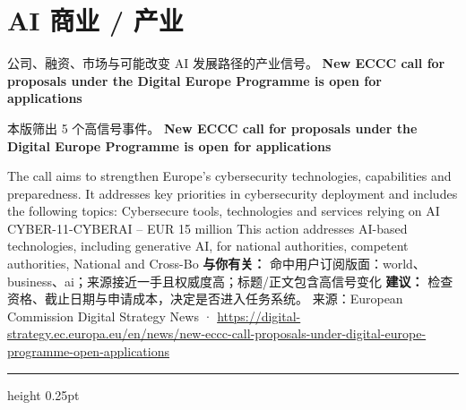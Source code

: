 \documentclass[10.5pt]{ctexart}
\begin{document}
\section*{AI 商业 / 产业}
{\color{ormuted} 公司、融资、市场与可能改变 AI 发展路径的产业信号。}
\vspace{2mm}
{\LARGE\bfseries New ECCC call for proposals under the Digital Europe Programme is open for applications}\par
\vspace{1mm}
{\color{ormuted} 本版筛出 5 个高信号事件。}
\vspace{3mm}
{\Large\bfseries New ECCC call for proposals under the Digital Europe Programme is open for applications}\par
The call aims to strengthen Europe’s cybersecurity technologies, capabilities and preparedness. It addresses key priorities in cybersecurity deployment and includes the following topics: Cybersecure tools, technologies and services relying on AI CYBER-11-CYBERAI – EUR 15 million This action addresses AI-based technologies, including generative AI, for national authorities, competent authorities, National and Cross-Bo
\textbf{与你有关：} 命中用户订阅版面：world、business、ai；来源接近一手且权威度高；标题/正文包含高信号变化
\textbf{建议：} 检查资格、截止日期与申请成本，决定是否进入任务系统。
{\footnotesize\color{ormuted} 来源：European Commission Digital Strategy News · \url{https://digital-strategy.ec.europa.eu/en/news/new-eccc-call-proposals-under-digital-europe-programme-open-applications}}
\vspace{4mm}
\hrule height 0.25pt
\vspace{3mm}
\end{document}
